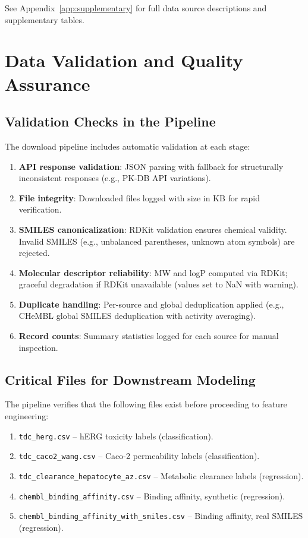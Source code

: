 \documentclass[a4paper,11pt,twoside]{report}
\begin{document}
See Appendix~\ref{app:supplementary} for full data source descriptions and supplementary tables.


\section{Data Validation and Quality Assurance}

\subsection{Validation Checks in the Pipeline}

The download pipeline includes automatic validation at each stage:

\begin{enumerate}
\item \textbf{API response validation}: JSON parsing with fallback for structurally inconsistent responses (e.g., PK-DB API variations).
\item \textbf{File integrity}: Downloaded files logged with size in KB for rapid verification.
\item \textbf{SMILES canonicalization}: RDKit validation ensures chemical validity. Invalid SMILES (e.g., unbalanced parentheses, unknown atom symbols) are rejected.
\item \textbf{Molecular descriptor reliability}: MW and logP computed via RDKit; graceful degradation if RDKit unavailable (values set to NaN with warning).
\item \textbf{Duplicate handling}: Per-source and global deduplication applied (e.g., CHeMBL global SMILES deduplication with activity averaging).
\item \textbf{Record counts}: Summary statistics logged for each source for manual inspection.
\end{enumerate}

\subsection{Critical Files for Downstream Modeling}

The pipeline verifies that the following files exist before proceeding to feature engineering:

\begin{enumerate}
\item \texttt{tdc\_herg.csv} -- hERG toxicity labels (classification).
\item \texttt{tdc\_caco2\_wang.csv} -- Caco-2 permeability labels (classification).
\item \texttt{tdc\_clearance\_hepatocyte\_az.csv} -- Metabolic clearance labels (regression).
\item \texttt{chembl\_binding\_affinity.csv} -- Binding affinity, synthetic (regression).
\item \texttt{chembl\_binding\_affinity\_with\_smiles.csv} -- Binding affinity, real SMILES (regression).
\end{enumerate}
\end{document}
